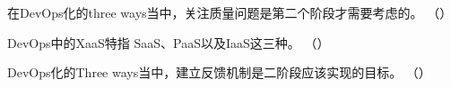 \begin{problem}
    在DevOps化的three ways当中，关注质量问题是第二个阶段才需要考虑的。
    \hfill （{}）
\end{problem}



\begin{problem}
    DevOps中的XaaS特指 SaaS、PaaS以及IaaS这三种。
    \hfill （{}）
\end{problem}



\begin{problem}
    DevOps化的Three ways当中，建立反馈机制是二阶段应该实现的目标。
    \hfill （{}）
\end{problem}

